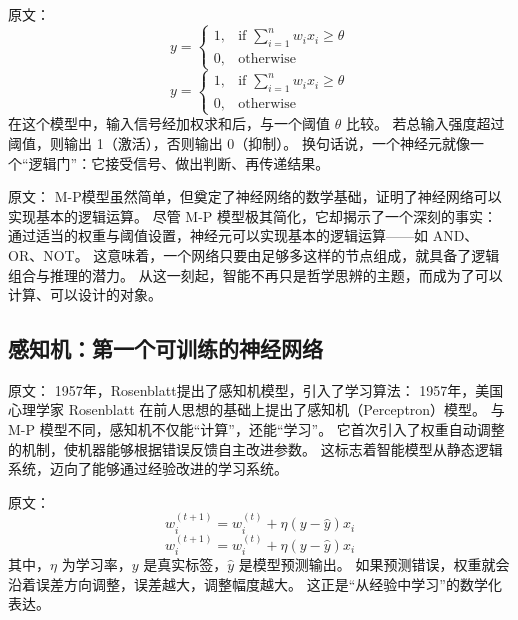 原文：
\begin{equation}
y = \begin{cases}
1, & \text{if } \sum_{i=1}^{n} w_i x_i \geq \theta \\
0, & \text{otherwise}
\end{cases}
\end{equation}
\begin{equation}
y = 
\begin{cases}
1, & \text{if } \sum_{i=1}^{n} w_i x_i \geq \theta \\
0, & \text{otherwise}
\end{cases}
\end{equation}
在这个模型中，输入信号经加权求和后，与一个阈值 $\theta$ 比较。  
若总输入强度超过阈值，则输出 1（激活），否则输出 0（抑制）。  
换句话说，一个神经元就像一个“逻辑门”：它接受信号、做出判断、再传递结果。

原文：
M-P模型虽然简单，但奠定了神经网络的数学基础，证明了神经网络可以实现基本的逻辑运算。
尽管 M-P 模型极其简化，它却揭示了一个深刻的事实：  
通过适当的权重与阈值设置，神经元可以实现基本的逻辑运算——如 AND、OR、NOT。  
这意味着，一个网络只要由足够多这样的节点组成，就具备了逻辑组合与推理的潜力。  
从这一刻起，智能不再只是哲学思辨的主题，而成为了可以计算、可以设计的对象。


\subsection{感知机：第一个可训练的神经网络}

原文：
1957年，Rosenblatt提出了感知机模型，引入了学习算法：
1957年，美国心理学家 Rosenblatt 在前人思想的基础上提出了感知机（Perceptron）模型。  
与 M-P 模型不同，感知机不仅能“计算”，还能“学习”。  
它首次引入了权重自动调整的机制，使机器能够根据错误反馈自主改进参数。  
这标志着智能模型从静态逻辑系统，迈向了能够通过经验改进的学习系统。

原文：
\begin{equation}
w_{i}^{(t+1)} = w_{i}^{(t)} + \eta (y - \hat{y}) x_i
\end{equation}
\begin{equation}
w_{i}^{(t+1)} = w_{i}^{(t)} + \eta (y - \hat{y}) x_i
\end{equation}
其中，$\eta$ 为学习率，$y$ 是真实标签，$\hat{y}$ 是模型预测输出。  
如果预测错误，权重就会沿着误差方向调整，误差越大，调整幅度越大。  
这正是“从经验中学习”的数学化表达。

